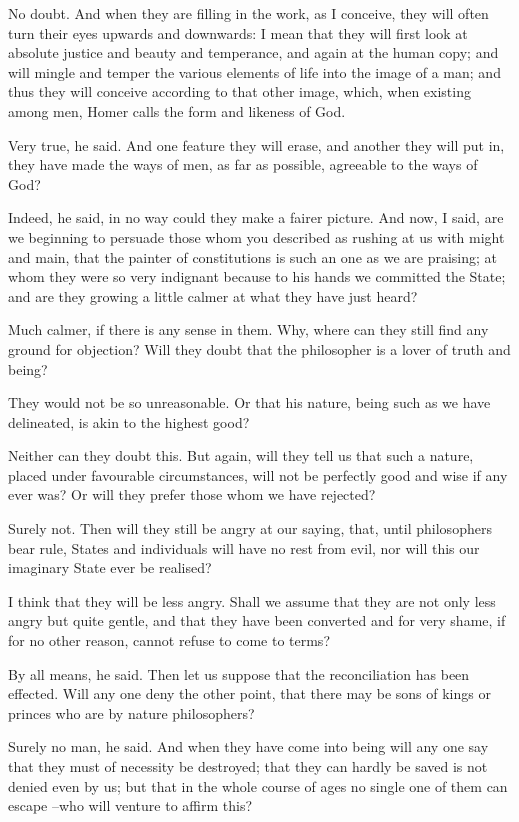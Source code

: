 No doubt.
And when they are filling in the work, as I conceive, they will often turn their eyes upwards and downwards: I mean that they will first look at absolute justice and beauty and temperance, and again at the human copy; and will mingle and temper the various elements of life into the image of a man; and thus they will conceive according to that other image, which, when existing among men, Homer calls the form and likeness of God.

Very true, he said.
And one feature they will erase, and another they will put in, they have made the ways of men, as far as possible, agreeable to the ways of God?

Indeed, he said, in no way could they make a fairer picture.
And now, I said, are we beginning to persuade those whom you described as rushing at us with might and main, that the painter of constitutions is such an one as we are praising; at whom they were so very indignant because to his hands we committed the State; and are they growing a little calmer at what they have just heard?

Much calmer, if there is any sense in them.
Why, where can they still find any ground for objection? Will they doubt that the philosopher is a lover of truth and being?

They would not be so unreasonable.
Or that his nature, being such as we have delineated, is akin to the highest good?

Neither can they doubt this.
But again, will they tell us that such a nature, placed under favourable circumstances, will not be perfectly good and wise if any ever was? Or will they prefer those whom we have rejected?

Surely not.
Then will they still be angry at our saying, that, until philosophers bear rule, States and individuals will have no rest from evil, nor will this our imaginary State ever be realised?

I think that they will be less angry.
Shall we assume that they are not only less angry but quite gentle, and that they have been converted and for very shame, if for no other reason, cannot refuse to come to terms?

By all means, he said.
Then let us suppose that the reconciliation has been effected. Will any one deny the other point, that there may be sons of kings or princes who are by nature philosophers?

Surely no man, he said.
And when they have come into being will any one say that they must of necessity be destroyed; that they can hardly be saved is not denied even by us; but that in the whole course of ages no single one of them can escape --who will venture to affirm this?

